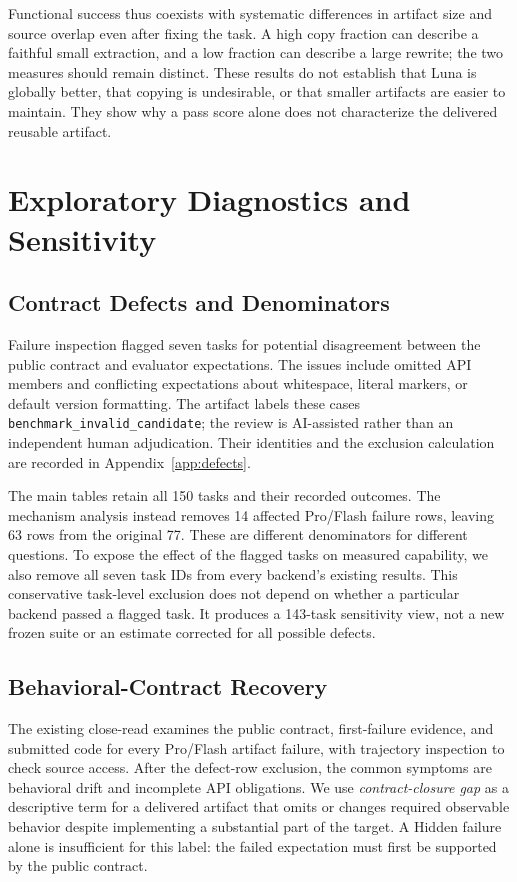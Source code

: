 \documentclass[acmsmall,screen,review,anonymous]{acmart}
\begin{document}
Functional success thus coexists with systematic differences in artifact size
and source overlap even after fixing the task. A high copy fraction can describe
a faithful small extraction, and a low fraction can describe a large rewrite;
the two measures should remain distinct. These results do not establish that
Luna is globally better, that copying is undesirable, or that smaller artifacts
are easier to maintain. They show why a pass score alone does not characterize
the delivered reusable artifact.

\section{Exploratory Diagnostics and Sensitivity}
\label{sec:diagnostics}

\subsection{Contract Defects and Denominators}
\label{sec:defects}

Failure inspection flagged seven tasks for potential disagreement between the
public contract and evaluator expectations. The issues include omitted API
members and conflicting expectations about whitespace, literal markers, or
default version formatting. The artifact labels these cases
\texttt{benchmark\_invalid\_candidate}; the review is AI-assisted rather than
an independent human adjudication. Their identities and the exclusion
calculation are recorded in Appendix~\ref{app:defects}.

The main tables retain all 150 tasks and their recorded outcomes. The mechanism
analysis instead removes 14 affected Pro/Flash failure rows, leaving 63 rows
from the original 77. These are different denominators for different questions.
To expose the effect of the flagged tasks on measured capability, we also remove
all seven task IDs from every backend's existing results. This conservative
task-level exclusion does not depend on whether a particular backend passed a
flagged task. It produces a 143-task sensitivity view, not a new frozen suite
or an estimate corrected for all possible defects.


\subsection{Behavioral-Contract Recovery}

The existing close-read examines the public contract, first-failure evidence,
and submitted code for every Pro/Flash artifact failure, with trajectory
inspection to check source access. After the defect-row exclusion, the common
symptoms are behavioral drift and incomplete API obligations. We use
\emph{contract-closure gap} as a descriptive term for a delivered artifact
that omits or changes required observable behavior despite implementing a
substantial part of the target. A Hidden failure alone is insufficient for this
label: the failed expectation must first be supported by the public contract.
\end{document}
